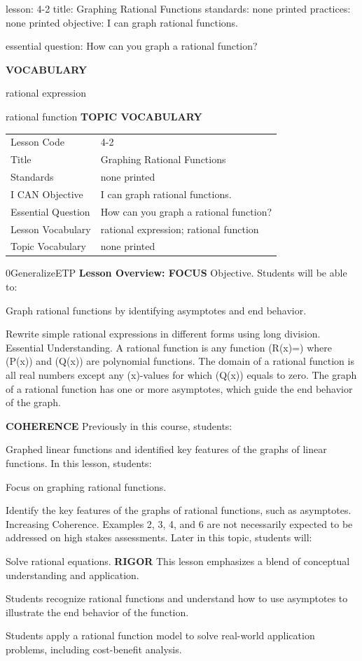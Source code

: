 \documentclass{article}
\newenvironment{lesson-meta}{}{}        %
\newenvironment{te-addendum}[2]{}{}     %
\newcommand{\te}[1]{}                   %
\begin{document}
\begin{lesson-meta}
lesson: 4-2
title: Graphing Rational Functions
standards: none printed
practices: none printed
objective: I can graph rational functions.

essential question: How can you graph a rational function?

\textbf{VOCABULARY}
\item rational expression
\item rational function
\textbf{TOPIC VOCABULARY}
\te{No topic vocabulary list is printed on these lesson pages.}
\begin{tabular}{ll}
Lesson Code & 4-2 \\
Title & Graphing Rational Functions \\
Standards & none printed \\
I CAN Objective & I can graph rational functions. \\
Essential Question & How can you graph a rational function? \\
Lesson Vocabulary & rational expression; rational function \\
Topic Vocabulary & none printed \\
\end{tabular}
\end{lesson-meta}
\begin{te-addendum}{0}{GeneralizeETP}
\textbf{Lesson Overview: FOCUS}
Objective. Students will be able to:
\item Graph rational functions by identifying asymptotes and end behavior.
\item Rewrite simple rational expressions in different forms using long division.
Essential Understanding. A rational function is any function (R(x)=) where (P(x)) and (Q(x)) are polynomial functions. The domain of a rational function is all real numbers except any (x)-values for which (Q(x)) equals to zero. The graph of a rational function has one or more asymptotes, which guide the end behavior of the graph.
\te{Printed generalization about one or more asymptotes does not cover all rational functions.}
\textbf{COHERENCE}
Previously in this course, students:
\item Graphed linear functions and identified key features of the graphs of linear functions.
In this lesson, students:
\item Focus on graphing rational functions.
\item Identify the key features of the graphs of rational functions, such as asymptotes.
Increasing Coherence. Examples 2, 3, 4, and 6 are not necessarily expected to be addressed on high stakes assessments.
Later in this topic, students will:
\item Solve rational equations.
\textbf{RIGOR}
This lesson emphasizes a blend of conceptual understanding and application.
\item Students recognize rational functions and understand how to use asymptotes to illustrate the end behavior of the function.
\item Students apply a rational function model to solve real-world application problems, including cost-benefit analysis.
\end{te-addendum}
\end{document}
